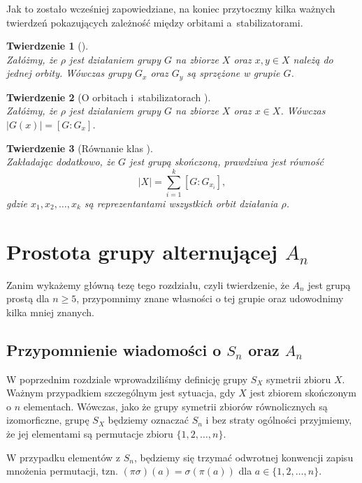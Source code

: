 \documentclass[licencjacka]{pracamgr}
\newtheorem{thh}{Twierdzenie}[section]
\begin{document}
Jak to zostało wcześniej zapowiedziane, na koniec przytoczmy kilka
ważnych twierdzeń pokazujących zależność między orbitami
a~stabilizatorami.

\begin{thh}[{\cite[tw. II.1.3.c)]{BB}}]\label{conj_stab} $ $\\
    Załóżmy, że $\rho$ jest działaniem grupy $G$ na zbiorze $X$ oraz $x, y \in X$ należą do jednej orbity.
    Wówczas grupy $G_x$ oraz $G_y$ są sprzężone w grupie $G$.
\end{thh}

\begin{thh}[{O orbitach i~stabilizatorach \cite[stw. 11.3.]{Baginski}}] $ $\\
    Załóżmy, że $\rho$ jest działaniem grupy $G$ na zbiorze $X$ oraz $x\in X$.
    Wówczas $|G(x)| = [G : G_x]$.
\end{thh}

\begin{thh}[{Równanie klas \cite[str. 37]{Lang}}]  $ $\\
    Zakładając dodatkowo, że $G$ jest grupą skończoną, prawdziwa jest równość
    $$ |X| = \sum_{i=1}^k [G : G_{x_i}] ,$$
    gdzie $x_1, x_2, \ldots, x_k$ są reprezentantami wszystkich orbit działania $\rho$.
\end{thh}



\chapter{Prostota grupy alternującej $A_n$}

Zanim wykażemy główną tezę tego rozdziału, czyli twierdzenie, że $A_n$
jest grupą prostą dla $n \ge 5$, przypomnimy znane własności o tej
grupie oraz udowodnimy kilka mniej znanych.

\section{Przypomnienie wiadomości o $S_n$ oraz $A_n$}

W poprzednim rozdziale wprowadziliśmy definicję grupy $S_X$ symetrii
zbioru $X$. Ważnym przypadkiem szczególnym jest sytuacja, gdy $X$
jest zbiorem skończonym o $n$ elementach. Wówczas, jako że grupy
symetrii zbiorów równolicznych są izomorficzne, grupę $S_X$ będziemy
oznaczać $S_n$ i bez straty ogólności przyjmiemy, że jej elementami
są permutacje zbioru $\{1, 2, \ldots, n\}$.

W przypadku elementów z $S_n$, będziemy się trzymać odwrotnej konwencji 
zapisu mnożenia permutacji,
tzn. $(\pi \sigma) (a) = \sigma ( \pi (a) )$ dla $a \in \{1, 2, \ldots, n\}$.
\end{document}
